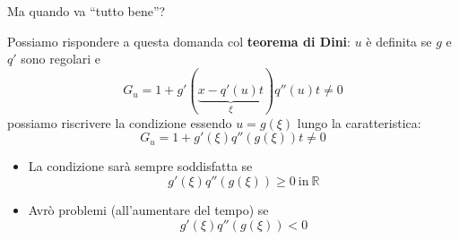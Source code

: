 \documentclass[10pt,a4paper,twoside,openright]{book}
\begin{document}
Ma quando va ``tutto bene''?

Possiamo rispondere a questa domanda col \textbf{teorema di Dini}: $\displaystyle u$ è definita se $\displaystyle g$ e $\displaystyle q'$ sono regolari e 
\begin{equation*}
	G_{u} =1+g'(\underbrace{x-q'( u) t}_{\xi }) q''( u) t\neq 0
\end{equation*}
possiamo riscrivere la condizione essendo $\displaystyle u=g( \xi )$ lungo la caratteristica:
\begin{equation}
	\boxed{G_{u} =1+g'( \xi ) q''( g( \xi )) t\neq 0}
	\label{eq:condizione-tutto-bene}
\end{equation}
\begin{itemize}
	\item La condizione sarà sempre soddisfatta se\begin{equation*}
	      g'( \xi ) q''( g( \xi )) \geqslant 0\ \text{in} \ \mathbb{R}
	\end{equation*}
	\item Avrò problemi (all'aumentare del tempo) se\begin{equation*}
	      g'( \xi ) q''( g( \xi )) < 0
	\end{equation*}
\end{itemize}
\end{document}
